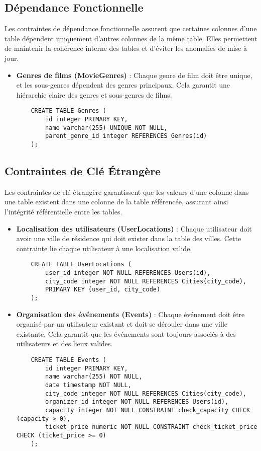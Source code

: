 \subsection{Dépendance Fonctionnelle}

Les contraintes de dépendance fonctionnelle assurent que certaines colonnes d'une table dépendent uniquement d'autres colonnes de la même table. Elles permettent de maintenir la cohérence interne des tables et d'éviter les anomalies de mise à jour.

\begin{itemize}
    \item \textbf{Genres de films (MovieGenres)} : Chaque genre de film doit être unique, et les sous-genres dépendent des genres principaux. Cela garantit une hiérarchie claire des genres et sous-genres de films.
    \begin{lstlisting}
    CREATE TABLE Genres (
        id integer PRIMARY KEY,
        name varchar(255) UNIQUE NOT NULL,
        parent_genre_id integer REFERENCES Genres(id)
    );
    \end{lstlisting}
\end{itemize}

\subsection{Contraintes de Clé Étrangère}

Les contraintes de clé étrangère garantissent que les valeurs d'une colonne dans une table existent dans une colonne de la table référencée, assurant ainsi l'intégrité référentielle entre les tables.

\begin{itemize}
    \item \textbf{Localisation des utilisateurs (UserLocations)} : Chaque utilisateur doit avoir une ville de résidence qui doit exister dans la table des villes. Cette contrainte lie chaque utilisateur à une localisation valide.
    \begin{lstlisting}
    CREATE TABLE UserLocations (
        user_id integer NOT NULL REFERENCES Users(id),
        city_code integer NOT NULL REFERENCES Cities(city_code),
        PRIMARY KEY (user_id, city_code)
    );
    \end{lstlisting}
    \item \textbf{Organisation des événements (Events)} : Chaque événement doit être organisé par un utilisateur existant et doit se dérouler dans une ville existante. Cela garantit que les événements sont toujours associés à des utilisateurs et des lieux valides.
    \begin{lstlisting}
    CREATE TABLE Events (
        id integer PRIMARY KEY,
        name varchar(255) NOT NULL,
        date timestamp NOT NULL,
        city_code integer NOT NULL REFERENCES Cities(city_code),
        organizer_id integer NOT NULL REFERENCES Users(id),
        capacity integer NOT NULL CONSTRAINT check_capacity CHECK (capacity > 0),
        ticket_price numeric NOT NULL CONSTRAINT check_ticket_price CHECK (ticket_price >= 0)
    );
    \end{lstlisting}
\end{itemize}

